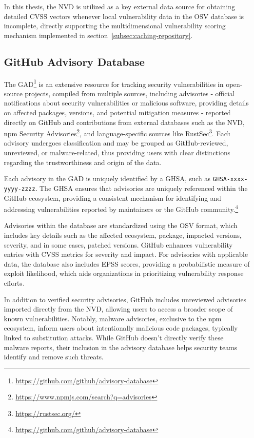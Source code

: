 In this thesis, the \ac{NVD} is utilized as a key external data source for obtaining detailed \ac{CVSS} vectors whenever local vulnerability data in the \ac{OSV} database is incomplete, directly supporting the multidimensional vulnerability scoring mechanism implemented in section~\ref{subsec:caching-repository}.

\subsection{GitHub Advisory Database}
\label{subsec:github-advisory-database}

The \ac{GAD}\footnote{\url{https://github.com/github/advisory-database}} is an extensive resource for tracking security vulnerabilities in open-source projects, compiled from multiple sources, including advisories - official notifications about security vulnerabilities or malicious software, providing details on affected packages, versions, and potential mitigation measures - reported directly on GitHub and contributions from external databases such as the \ac{NVD}, npm Security Advisories\footnote{\url{https://www.npmjs.com/search?q=advisories}}, and language-specific sources like RustSec\footnote{\url{https://rustsec.org/}}. Each advisory undergoes classification and may be grouped as GitHub-reviewed, unreviewed, or malware-related, thus providing users with clear distinctions regarding the trustworthiness and origin of the data.

Each advisory in the \ac{GAD} is uniquely identified by a \ac{GHSA}, such as \texttt{GHSA-xxxx-yyyy-zzzz}. The \ac{GHSA} ensures that advisories are uniquely referenced within the GitHub ecosystem, providing a consistent mechanism for identifying and addressing vulnerabilities reported by maintainers or the GitHub community.\footnote{\url{https://github.com/github/advisory-database}}

Advisories within the database are standardized using the \ac{OSV} format, which includes key details such as the affected ecosystem, package, impacted versions, severity, and in some cases, patched versions. GitHub enhances vulnerability entries with \ac{CVSS} metrics for severity and impact. For advisories with applicable data, the database also includes \ac{EPSS} scores, providing a probabilistic measure of exploit likelihood, which aids organizations in prioritizing vulnerability response efforts.

In addition to verified security advisories, GitHub includes unreviewed advisories imported directly from the \ac{NVD}, allowing users to access a broader scope of known vulnerabilities. Notably, malware advisories, exclusive to the npm ecosystem, inform users about intentionally malicious code packages, typically linked to substitution attacks. While GitHub doesn’t directly verify these malware reports, their inclusion in the advisory database helps security teams identify and remove such threats.

